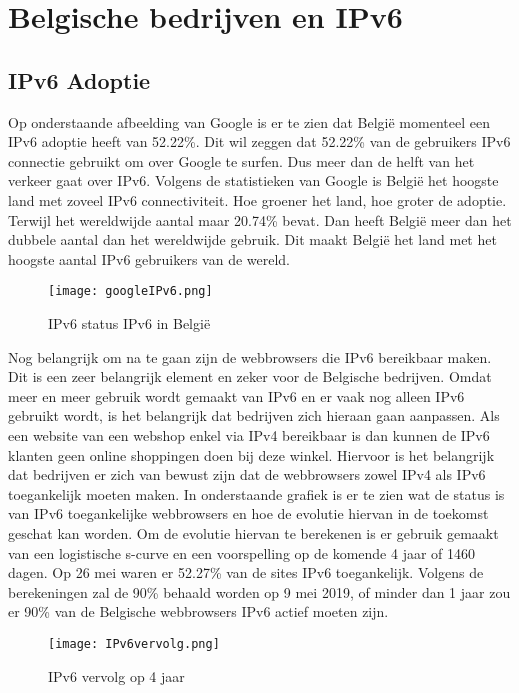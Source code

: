 
\chapter{Belgische bedrijven en IPv6}
\label{ch:h6}

\section{IPv6 Adoptie}

Op onderstaande afbeelding van Google is er te zien dat België momenteel een IPv6 adoptie heeft van 52.22\%. Dit wil zeggen dat 52.22\% van de gebruikers IPv6 connectie gebruikt om over Google te surfen. Dus meer dan de helft van het verkeer gaat over IPv6. Volgens de statistieken van Google is België het hoogste land met zoveel IPv6 connectiviteit. Hoe groener het land, hoe groter de adoptie. Terwijl het wereldwijde aantal maar 20.74\% bevat. Dan heeft België meer dan het dubbele aantal dan het wereldwijde gebruik. Dit maakt België het land met het hoogste aantal IPv6 gebruikers van de wereld.

\begin{figure}
\centering
\texttt{[image: googleIPv6.png]}
\caption{IPv6 status IPv6 in België \autocite{GoogleIPv6Belgie}}
\end{figure}

Nog belangrijk om na te gaan zijn de webbrowsers die IPv6 bereikbaar maken. Dit is een zeer belangrijk element en zeker voor de Belgische bedrijven. Omdat meer en meer gebruik wordt gemaakt van IPv6 en er vaak nog alleen IPv6 gebruikt wordt, is het belangrijk dat bedrijven zich hieraan gaan aanpassen. Als een website van een webshop enkel via IPv4 bereikbaar is dan kunnen de IPv6 klanten geen online shoppingen doen bij deze winkel. Hiervoor is het belangrijk dat bedrijven er zich van bewust zijn dat de webbrowsers zowel IPv4 als IPv6 toegankelijk moeten maken. In onderstaande grafiek is er te zien wat de status is van IPv6 toegankelijke webbrowsers en hoe de evolutie hiervan in de toekomst geschat kan worden. Om de evolutie hiervan te berekenen is er gebruik gemaakt van een logistische s-curve en een voorspelling op de komende 4 jaar of 1460 dagen. Op 26 mei waren er 52.27\% van de sites IPv6 toegankelijk. Volgens de berekeningen zal de 90\% behaald worden op 9 mei 2019, of minder dan 1 jaar zou er 90\% van de Belgische webbrowsers IPv6 actief moeten zijn.

\begin{figure}
\centering
\texttt{[image: IPv6vervolg.png]}
\caption{IPv6 vervolg op 4 jaar \autocite{Vyncke2018}}
\end{figure}

